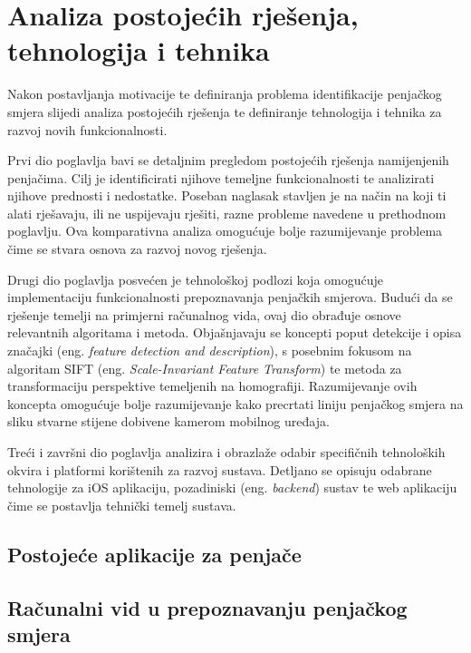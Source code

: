 \chapter{Analiza postojećih rješenja, tehnologija i tehnika}

Nakon postavljanja motivacije te definiranja problema identifikacije penjačkog smjera slijedi analiza postojećih rješenja te definiranje tehnologija i tehnika za razvoj novih funkcionalnosti. 

Prvi dio poglavlja bavi se detaljnim pregledom postojećih rješenja namijenjenih penjačima. Cilj je identificirati njihove temeljne funkcionalnosti te analizirati njihove prednosti i nedostatke. Poseban naglasak stavljen je na način na koji ti alati rješavaju, ili ne uspijevaju rješiti, razne probleme navedene u prethodnom poglavlju. Ova komparativna analiza omogućuje bolje razumijevanje problema čime se stvara osnova za razvoj novog rješenja.

Drugi dio poglavlja posvećen je tehnološkoj podlozi koja omogućuje implementaciju funkcionalnosti prepoznavanja penjačkih smjerova. Budući da se rješenje temelji na primjerni računalnog vida, ovaj dio obrađuje osnove relevantnih algoritama i metoda. Objašnjavaju se koncepti poput detekcije i opisa značajki (eng. \textit{feature detection and description}), s posebnim fokusom na algoritam SIFT (eng. \textit{Scale-Invariant Feature Transform}) te metoda za transformaciju perspektive temeljenih na homografiji. Razumijevanje ovih koncepta omogućuje bolje razumijevanje kako precrtati liniju penjačkog smjera na sliku stvarne stijene dobivene kamerom mobilnog uređaja.

Treći i završni dio poglavlja analizira i obrazlaže odabir specifičnih tehnoloških okvira i platformi korištenih za razvoj sustava. Detljano se opisuju odabrane tehnologije za iOS aplikaciju, pozadiniski (eng. \textit{backend}) sustav te web aplikaciju čime se postavlja tehnički temelj sustava.

\section{Postojeće aplikacije za penjače}



\section{Računalni vid u prepoznavanju penjačkog smjera}

